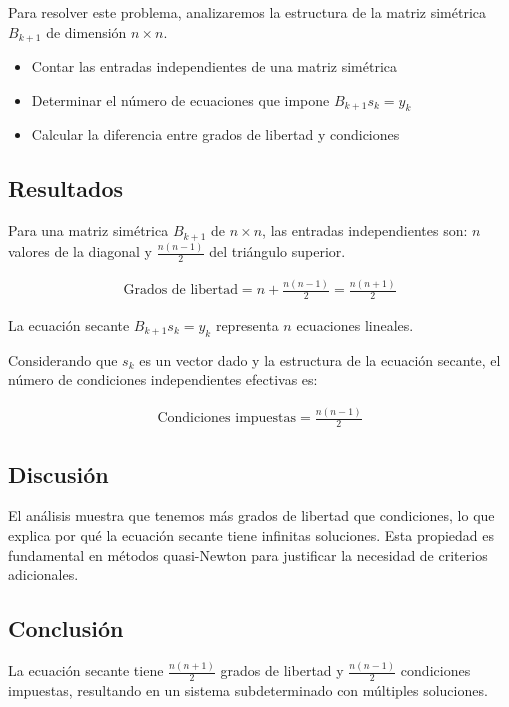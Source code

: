 \documentclass{article}
\begin{document}
Para resolver este problema, analizaremos la estructura de la matriz simétrica $B_{k+1}$ de dimensión $n \times n$.

\begin{itemize}
    \item Contar las entradas independientes de una matriz simétrica
    \item Determinar el número de ecuaciones que impone $B_{k+1} s_k = y_k$
    \item Calcular la diferencia entre grados de libertad y condiciones
\end{itemize}

\subsection{Resultados}
\setcounter{equation}{0}

Para una matriz simétrica $B_{k+1}$ de $n \times n$, las entradas independientes son: $n$ valores de la diagonal y $\frac{n(n-1)}{2}$ del triángulo superior.

\begin{align}
    \text{Grados de libertad} = n + \frac{n(n-1)}{2} = \frac{n(n+1)}{2}
\end{align}

La ecuación secante $B_{k+1} s_k = y_k$ representa $n$ ecuaciones lineales.

Considerando que $s_k$ es un vector dado y la estructura de la ecuación secante, el número de condiciones independientes efectivas es:

\begin{align}
    \text{Condiciones impuestas} = \frac{n(n-1)}{2}
\end{align}

\subsection{Discusión}

El análisis muestra que tenemos más grados de libertad que condiciones, lo que explica por qué la ecuación secante tiene infinitas soluciones. Esta propiedad es fundamental en métodos quasi-Newton para justificar la necesidad de criterios adicionales.

\subsection{Conclusión}

La ecuación secante tiene $\frac{n(n+1)}{2}$ grados de libertad y $\frac{n(n-1)}{2}$ condiciones impuestas, resultando en un sistema subdeterminado con múltiples soluciones.
\end{document}
